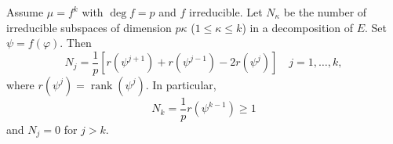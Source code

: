 Assume $\mu = f^k$ with $\deg f = p$ and $f$ irreducible. Let $N_\kappa$ be the number of irreducible subspaces of dimension $p\kappa$ ($1 \leq \kappa \leq k$) in a decomposition of $E$. Set $\psi = f(\varphi)$. Then
$$N_j = \frac{1}{p} \left[ r(\psi^{j+1}) + r(\psi^{j-1}) - 2r(\psi^j) \right] \quad j = 1, \ldots, k,$$
where $r(\psi^j) = \operatorname{rank}(\psi^j)$. In particular,
$$N_k = \frac{1}{p} r(\psi^{k-1}) \geq 1$$
and $N_j = 0$ for $j > k$.
